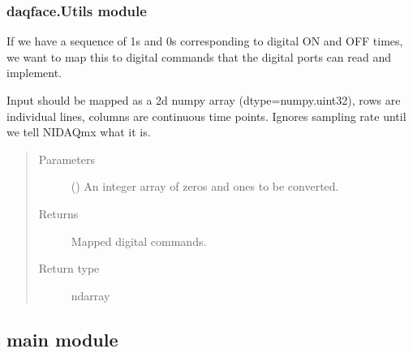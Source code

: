 \documentclass[letterpaper,10pt,english]{sphinxmanual}
\begin{document}
\subsubsection{daqface.Utils module}
\label{\detokenize{NoSeMazeControl/daqface:module-daqface.Utils}}\label{\detokenize{NoSeMazeControl/daqface:daqface-utils-module}}

\begin{fulllineitems}
\label{\detokenize{NoSeMazeControl/daqface:daqface.Utils.binary_to_digital_map}}
\pysigstartsignatures
{}
\pysigstopsignatures
\sphinxAtStartPar
If we have a sequence of 1s and 0s corresponding to digital ON
and OFF times, we want to map this to digital commands that the digital
ports can read and implement.

\sphinxAtStartPar
Input should be mapped as a 2d numpy array (dtype=numpy.uint32), rows are
individual lines, columns are continuous time points. Ignores sampling
rate until we tell NIDAQmx what it is.
\begin{quote}\begin{description}
\item[{Parameters}] \leavevmode
\sphinxAtStartPar
{} () \textendash{} An integer array of zeros and ones to be converted.

\item[{Returns}] \leavevmode
\sphinxAtStartPar
{} \textendash{} Mapped digital commands.

\item[{Return type}] \leavevmode
\sphinxAtStartPar
ndarray

\end{description}\end{quote}

\end{fulllineitems}


\sphinxstepscope


\subsection{main module}
\label{\detokenize{NoSeMazeControl/main:module-main}}\label{\detokenize{NoSeMazeControl/main:main-module}}\label{\detokenize{NoSeMazeControl/main::doc}}
\end{document}
